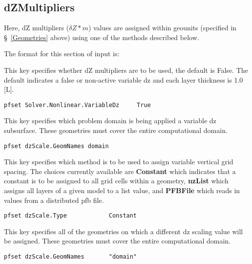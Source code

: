 \subsection{dZMultipliers}
\label{dZ Multipliers}

Here, dZ multipliers ($\delta Z * m$) values are assigned within geounits (specified in
\S~\ref{Geometries} above) using one of the methods described below.

The format for this section of input is:

{
This key specifies whether dZ multipliers are to be used, the default is False.
The default indicates a false or non-active variable dz and each layer thickness is 1.0 [L].
}
\begin{display}\begin{verbatim}
pfset Solver.Nonlinear.VariableDz     True
\end{verbatim}\end{display}

{
This key specifies which problem domain is being applied a variable dz subsurface.
These geometries must cover the entire computational domain.
}
\begin{display}\begin{verbatim}
pfset dzScale.GeomNames domain
\end{verbatim}\end{display}


{
This key specifies which method is to be used to assign variable vertical grid spacing.  The choices currently
available are {\bf Constant} which indicates that a constant is to be
assigned to all grid cells within a geometry, {\bf nzList} which assigns all layers of a given model to a list value,
and {\bf PFBFile} which reads in values from a distributed pfb file.
}
\begin{display}\begin{verbatim}
pfset dzScale.Type            Constant
\end{verbatim}\end{display}

{
This key specifies all of the geometries on which a different dz scaling value will be
assigned.  These geometries must cover the entire computational domain.
}
\begin{display}\begin{verbatim}
pfset dzScale.GeomNames       "domain"
\end{verbatim}\end{display}

